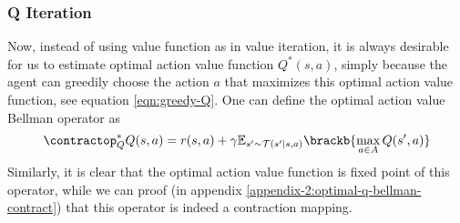 \subsubsection{Q Iteration}
\label{sec:Q-iteration}

Now, instead of using value function as in value iteration, it is always desirable for us to estimate optimal action value function $Q^*(s, a)$, simply because the agent can greedily choose the action $a$ that maximizes this optimal action value function, see equation \ref{eqn:greedy-Q}. One can define the optimal action value Bellman operator as 
\begin{equation}
    \contractop^*_Q Q(s, a) = r(s, a) + \gamma \mathbb{E}_{s' \sim \mathcal{T}(s' | s, a)}\brackb{\max_{a\in A} Q(s', a)} 
\end{equation}
Similarly, it is clear that the optimal action value function is fixed point of this operator, while we can proof (in appendix \ref{appendix-2:optimal-q-bellman-contract}) that this operator is indeed a contraction mapping.

